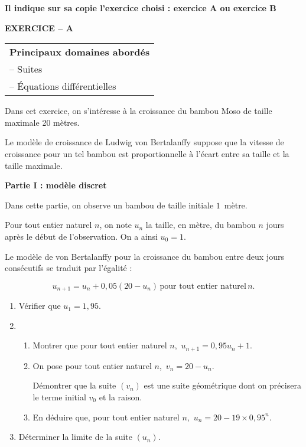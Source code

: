 \documentclass[11pt]{article}
\begin{document}
\medskip

\textbf{Il indique sur sa copie l'exercice choisi : exercice A ou exercice B}

\medskip

\textbf{EXERCICE -- A}

\medskip

\begin{tabular}{|l|}\hline
\textbf{Principaux domaines abordés}\\
-- Suites\\
-- Équations différentielles\\ \hline
\end{tabular}

\medskip

Dans cet exercice, on s'intéresse à la croissance du bambou Moso de taille maximale 20 mètres. 

Le modèle de croissance de Ludwig von Bertalanffy suppose que la vitesse de croissance pour un tel bambou est proportionnelle à l'écart entre sa taille et la taille maximale.

\bigskip

\textbf{Partie I : modèle discret}

\medskip

Dans cette partie, on observe un bambou de taille initiale $1$~mètre.

Pour tout entier naturel $n$, on note $u_n$ la taille, en mètre, du bambou $n$ jours après le début de l'observation. On a ainsi $u_0 = 1$.

Le modèle de von Bertalanffy pour la croissance du bambou entre deux jours consécutifs se traduit par l'égalité :

\[u_{n+1} = u_n + 0,05\left(20 - u_n\right)\,  \text{pour tout entier naturel}\,  n.\]

\medskip

\begin{enumerate}
\item Vérifier que $u_1 = 1,95$.
\item 
	\begin{enumerate}
		\item Montrer que pour tout entier naturel $n$,\,  $u_{n+1} = 0,95u_n + 1$.
		\item On pose pour tout entier naturel $n$,\,  $v_n = 20 - u_n$. 
		
Démontrer que la suite $\left(v_n\right)$ est une suite géométrique dont on précisera le terme initial $v_0$ et la raison.
		\item En déduire que, pour tout entier naturel $n$,\,  $u_n = 20 - 19 \times 0,95^n$.
	\end{enumerate}
\item Déterminer la limite de la suite $\left(u_n\right)$.
\end{enumerate}
\end{document}
